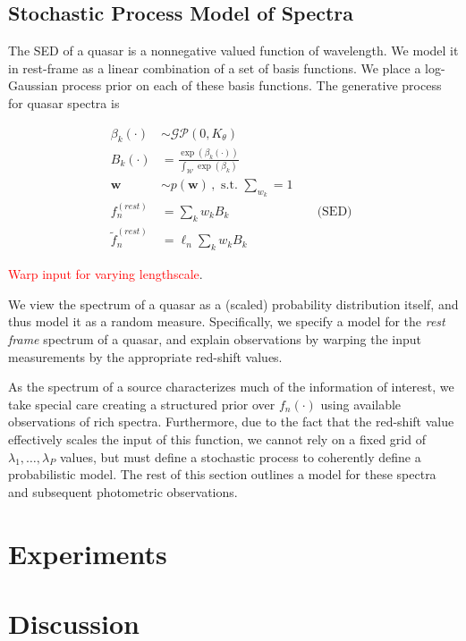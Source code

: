 \documentclass{article}
\newcommand{\red}[1]{\textcolor{red}{#1}}
\begin{document}
\subsection{Stochastic Process Model of Spectra}
The SED of a quasar is a nonnegative valued function of wavelength.  We model it in rest-frame as a linear combination of a set of basis functions.  We place a log-Gaussian process prior on each of these basis functions.  The generative process for quasar spectra is 

\begin{align}
  \beta_k(\cdot) &\sim \mathcal{GP}(0, K_\theta) \\
  B_k(\cdot) &= \frac{\exp(\beta_k(\cdot))}{\int_\mathcal{W} \exp(\beta_k)}   \\
  \mathbf{w} &\sim p(\mathbf{w}) \, , \text{ s.t. } \sum_{w_k} = 1  \\
  f^{(rest)}_n &= \sum_{k} w_k B_k &&\text{ (SED) }\\
  \tilde f^{(rest)}_n &= \ell_n \sum_{k} w_k B_k
\end{align}

\red{Warp input for varying lengthscale}.  


We view the spectrum of a quasar as a (scaled) probability distribution itself, and thus model it as a random measure.  Specifically, we specify a model for the \emph{rest frame} spectrum of a quasar, and explain observations by warping the input measurements by the appropriate red-shift values. 

As the spectrum of a source characterizes much of the information of interest, we take special care creating a structured prior over $f_n(\cdot)$ using available observations of rich spectra. Furthermore, due to the fact that the red-shift value effectively scales the input of this function, we cannot rely on a fixed grid of $\lambda_1, \dots, \lambda_P$ values, but must define a stochastic process to coherently define a probabilistic model.  The rest of this section outlines a model for these spectra and subsequent photometric observations.  


\section{Experiments}


\section{Discussion}
\end{document}
